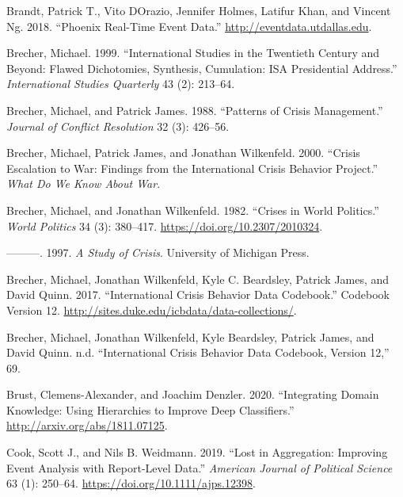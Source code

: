 \documentclass{article}
\newlength{\cslhangindent}
\newlength{\cslentryspacingunit} %
\newenvironment{CSLReferences}[2] %
 {%
  \setlength{\parindent}{0pt}
  \ifodd #1
  \let\oldpar\par
  \def\par{\hangindent=\cslhangindent\oldpar}
  \fi
  \setlength{\parskip}{#2\cslentryspacingunit}
 }%
 {}
\begin{document}
\begin{CSLReferences}{1}{0}
\leavevmode{}%
Brandt, Patrick T., Vito DOrazio, Jennifer Holmes, Latifur Khan, and
Vincent Ng. 2018. {``Phoenix {Real-Time Event Data}.''}
\url{http://eventdata.utdallas.edu}.

\leavevmode{}%
Brecher, Michael. 1999. {``International Studies in the Twentieth
Century and Beyond: {Flawed} Dichotomies, Synthesis, Cumulation: {ISA}
Presidential Address.''} \emph{International Studies Quarterly} 43 (2):
213--64.

\leavevmode{}%
Brecher, Michael, and Patrick James. 1988. {``Patterns of Crisis
Management.''} \emph{Journal of Conflict Resolution} 32 (3): 426--56.

\leavevmode{}%
Brecher, Michael, Patrick James, and Jonathan Wilkenfeld. 2000.
{``Crisis Escalation to War: {Findings} from the {International Crisis
Behavior Project}.''} \emph{What Do We Know About War}.

\leavevmode{}%
Brecher, Michael, and Jonathan Wilkenfeld. 1982. {``Crises in {World
Politics}.''} \emph{World Politics} 34 (3): 380--417.
\url{https://doi.org/10.2307/2010324}.

\leavevmode{}%
---------. 1997. \emph{A {Study} of {Crisis}}. {University of Michigan
Press}.

\leavevmode{}%
Brecher, Michael, Jonathan Wilkenfeld, Kyle C. Beardsley, Patrick James,
and David Quinn. 2017. {``International {Crisis Behavior Data
Codebook}.''} Codebook Version 12.
\url{http://sites.duke.edu/icbdata/data-collections/}.

\leavevmode{}%
Brecher, Michael, Jonathan Wilkenfeld, Kyle Beardsley, Patrick James,
and David Quinn. n.d. {``International {Crisis Behavior Data Codebook},
{Version} 12,''} 69.

\leavevmode{}%
Brust, Clemens-Alexander, and Joachim Denzler. 2020. {``Integrating
Domain Knowledge: Using Hierarchies to Improve Deep Classifiers.''}
\url{http://arxiv.org/abs/1811.07125}.

\leavevmode{}%
Cook, Scott J., and Nils B. Weidmann. 2019. {``Lost in {Aggregation}:
{Improving Event Analysis} with {Report-Level Data}.''} \emph{American
Journal of Political Science} 63 (1): 250--64.
\url{https://doi.org/10.1111/ajps.12398}.


\end{CSLReferences}
\end{document}
